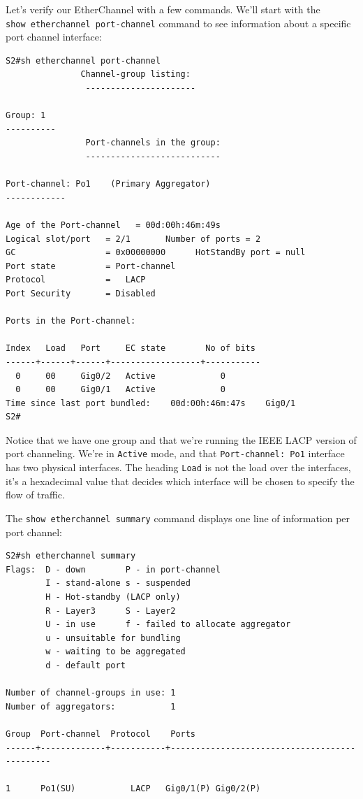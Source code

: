 \documentclass[b5paper,11pt]{memoir}
\begin{document}
Let's verify our EtherChannel with a few commands. We'll start with the
\texttt{show\ etherchannel\ port-channel} command to see information
about a specific port channel interface:

\begin{verbatim}
S2#sh etherchannel port-channel
               Channel-group listing:
                ----------------------
 
Group: 1
----------
                Port-channels in the group:
                ---------------------------
 
Port-channel: Po1    (Primary Aggregator)
------------
 
Age of the Port-channel   = 00d:00h:46m:49s
Logical slot/port   = 2/1       Number of ports = 2
GC                  = 0x00000000      HotStandBy port = null
Port state          = Port-channel
Protocol            =   LACP
Port Security       = Disabled
 
Ports in the Port-channel:
 
Index   Load   Port     EC state        No of bits
------+------+------+------------------+-----------
  0     00     Gig0/2   Active             0
  0     00     Gig0/1   Active             0
Time since last port bundled:    00d:00h:46m:47s    Gig0/1
S2#
\end{verbatim}

Notice that we have one group and that we're running the IEEE LACP
version of port channeling. We're in \texttt{Active} mode, and that
\texttt{Port-channel:\ Po1} interface has two physical interfaces. The
heading \texttt{Load} is not the load over the interfaces, it's a
hexadecimal value that decides which interface will be chosen to specify
the flow of traffic.

The \texttt{show\ etherchannel\ summary} command displays one line of
information per port channel:

\begin{verbatim}
S2#sh etherchannel summary
Flags:  D - down        P - in port-channel
        I - stand-alone s - suspended
        H - Hot-standby (LACP only)
        R - Layer3      S - Layer2
        U - in use      f - failed to allocate aggregator
        u - unsuitable for bundling
        w - waiting to be aggregated
        d - default port
 
Number of channel-groups in use: 1
Number of aggregators:           1
 
Group  Port-channel  Protocol    Ports
------+-------------+-----------+----------------------------------------------
 
1      Po1(SU)           LACP   Gig0/1(P) Gig0/2(P)
\end{verbatim}
\end{document}
